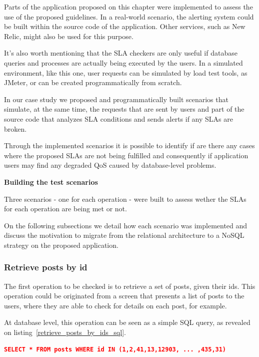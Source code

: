 Parts of the application proposed on this chapter were implemented to assess the use of the proposed guidelines. In a real-world scenario, the alerting system could be built within the source code of the application. Other services, such as New Relic, might also be used for this purpose. 

It's also worth mentioning that the SLA checkers are only useful if database queries and processes are actually being executed by the users. In a simulated environment, like this one, user requests can be simulated by load test tools, as JMeter, or can be created programmatically from scratch.

In our case study we proposed and programmatically built scenarios that simulate, at the same time, the requests that are sent by users and part of the source code that analyzes SLA conditions and sends alerts if any SLAs are broken. 

Through the implemented scenarios it is possible to identify if are there any cases where the proposed SLAs are not being fulfilled and consequently if application users may find any degraded QoS caused by database-level problems.

\textbf{Building the test scenarios}

Three scenarios - one for each operation - were built to assess wether the SLAs for each operation are being met or not.

On the following subsections we detail how each scenario was implemented and discuss the motivation to migrate from the relational architecture to a NoSQL strategy on the proposed application. 


\clearpage
\subsubsection{Retrieve posts by id}

The first operation to be checked is to retrieve a set of posts, given their ids. This operation could be originated from a screen that presents a list of posts to the users, where they are able to check for details on each post, for example. 

At database level, this operation can be seen as a simple SQL query, as revealed on listing~\ref{retrieve_posts_by_ids_sql}. 

\begin{lstlisting}[language=json,firstnumber=1, caption=SQL Query - Retrieve posts by ids, label=retrieve_posts_by_ids_sql]
SELECT * FROM posts WHERE id IN (1,2,41,13,12903, ... ,435,31)
\end{lstlisting}\label{query01}

